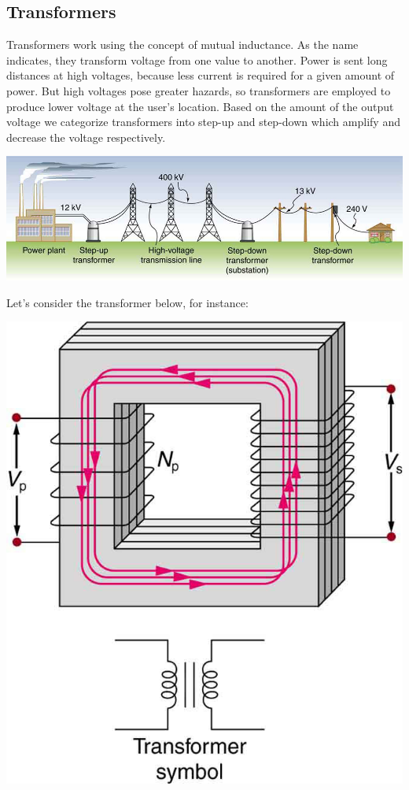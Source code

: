 \documentclass[9pt]{article}
\begin{document}
	\subsection*{Transformers}
	Transformers work using the concept of mutual inductance. As the name indicates, they transform voltage from one value to another. Power is sent long distances at high voltages, because less current is required for a given amount of
	power. But high voltages pose greater hazards, so transformers are employed to produce lower voltage at the user’s location. Based on the amount of the output voltage we categorize transformers into step-up and step-down which amplify and decrease the voltage respectively.
	\begin{center}
		\includegraphics[scale=0.5]{transformers}
	\end{center}
	Let's consider the transformer below, for instance:
	\begin{center}
		\includegraphics[scale=0.35]{transformer}
	\end{center}
\end{document}
